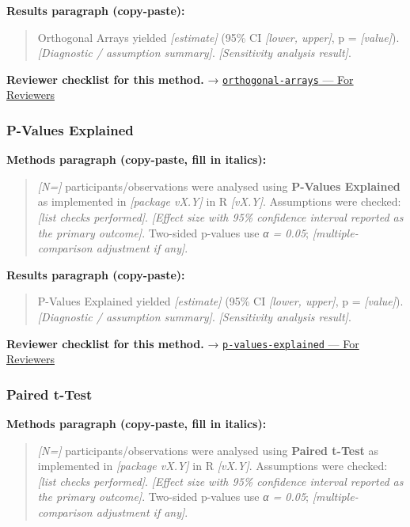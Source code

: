 \documentclass[
]{article}
\begin{document}
\textbf{Results paragraph (copy-paste):}

\begin{quote}
Orthogonal Arrays yielded \emph{{[}estimate{]}} (95\% CI \emph{{[}lower,
upper{]}}, p = \emph{{[}value{]}}). \emph{{[}Diagnostic / assumption
summary{]}}. \emph{{[}Sensitivity analysis result{]}}.
\end{quote}

\textbf{Reviewer checklist for this method.} →
\href{../chapters/16-design/orthogonal-arrays.Rmd\#for-reviewers}{\texttt{orthogonal-arrays}
--- For Reviewers}

\subsubsection{P-Values Explained}\label{p-values-explained}

\textbf{Methods paragraph (copy-paste, fill in italics):}

\begin{quote}
\emph{{[}N={]}} participants/observations were analysed using
\textbf{P-Values Explained} as implemented in \emph{{[}package vX.Y{]}}
in R \emph{{[}vX.Y{]}}. Assumptions were checked: \emph{{[}list checks
performed{]}}. \emph{{[}Effect size with 95\% confidence interval
reported as the primary outcome{]}}. Two-sided p-values use \emph{α =
0.05}; \emph{{[}multiple-comparison adjustment if any{]}}.
\end{quote}

\textbf{Results paragraph (copy-paste):}

\begin{quote}
P-Values Explained yielded \emph{{[}estimate{]}} (95\% CI
\emph{{[}lower, upper{]}}, p = \emph{{[}value{]}}). \emph{{[}Diagnostic
/ assumption summary{]}}. \emph{{[}Sensitivity analysis result{]}}.
\end{quote}

\textbf{Reviewer checklist for this method.} →
\href{../chapters/04-inferential/p-values-explained.Rmd\#for-reviewers}{\texttt{p-values-explained}
--- For Reviewers}

\subsubsection{Paired t-Test}\label{paired-t-test}

\textbf{Methods paragraph (copy-paste, fill in italics):}

\begin{quote}
\emph{{[}N={]}} participants/observations were analysed using
\textbf{Paired t-Test} as implemented in \emph{{[}package vX.Y{]}} in R
\emph{{[}vX.Y{]}}. Assumptions were checked: \emph{{[}list checks
performed{]}}. \emph{{[}Effect size with 95\% confidence interval
reported as the primary outcome{]}}. Two-sided p-values use \emph{α =
0.05}; \emph{{[}multiple-comparison adjustment if any{]}}.
\end{quote}
\end{document}

